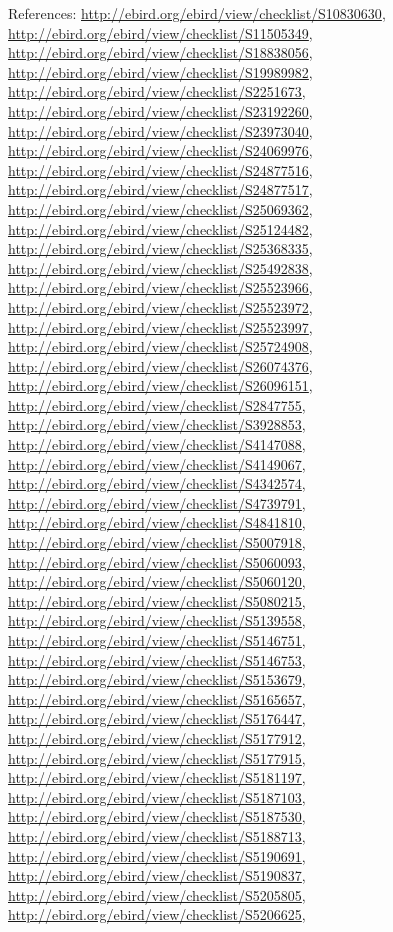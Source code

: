 \documentclass[9pt, article]{memoir}
\begin{document}
\begin{multicols}{2}
References: 
\url{http://ebird.org/ebird/view/checklist/S10830630}, 
\url{http://ebird.org/ebird/view/checklist/S11505349}, 
\url{http://ebird.org/ebird/view/checklist/S18838056}, 
\url{http://ebird.org/ebird/view/checklist/S19989982}, 
\url{http://ebird.org/ebird/view/checklist/S2251673}, 
\url{http://ebird.org/ebird/view/checklist/S23192260}, 
\url{http://ebird.org/ebird/view/checklist/S23973040}, 
\url{http://ebird.org/ebird/view/checklist/S24069976}, 
\url{http://ebird.org/ebird/view/checklist/S24877516}, 
\url{http://ebird.org/ebird/view/checklist/S24877517}, 
\url{http://ebird.org/ebird/view/checklist/S25069362}, 
\url{http://ebird.org/ebird/view/checklist/S25124482}, 
\url{http://ebird.org/ebird/view/checklist/S25368335}, 
\url{http://ebird.org/ebird/view/checklist/S25492838}, 
\url{http://ebird.org/ebird/view/checklist/S25523966}, 
\url{http://ebird.org/ebird/view/checklist/S25523972}, 
\url{http://ebird.org/ebird/view/checklist/S25523997}, 
\url{http://ebird.org/ebird/view/checklist/S25724908}, 
\url{http://ebird.org/ebird/view/checklist/S26074376}, 
\url{http://ebird.org/ebird/view/checklist/S26096151}, 
\url{http://ebird.org/ebird/view/checklist/S2847755}, 
\url{http://ebird.org/ebird/view/checklist/S3928853}, 
\url{http://ebird.org/ebird/view/checklist/S4147088}, 
\url{http://ebird.org/ebird/view/checklist/S4149067}, 
\url{http://ebird.org/ebird/view/checklist/S4342574}, 
\url{http://ebird.org/ebird/view/checklist/S4739791}, 
\url{http://ebird.org/ebird/view/checklist/S4841810}, 
\url{http://ebird.org/ebird/view/checklist/S5007918}, 
\url{http://ebird.org/ebird/view/checklist/S5060093}, 
\url{http://ebird.org/ebird/view/checklist/S5060120}, 
\url{http://ebird.org/ebird/view/checklist/S5080215}, 
\url{http://ebird.org/ebird/view/checklist/S5139558}, 
\url{http://ebird.org/ebird/view/checklist/S5146751}, 
\url{http://ebird.org/ebird/view/checklist/S5146753}, 
\url{http://ebird.org/ebird/view/checklist/S5153679}, 
\url{http://ebird.org/ebird/view/checklist/S5165657}, 
\url{http://ebird.org/ebird/view/checklist/S5176447}, 
\url{http://ebird.org/ebird/view/checklist/S5177912}, 
\url{http://ebird.org/ebird/view/checklist/S5177915}, 
\url{http://ebird.org/ebird/view/checklist/S5181197}, 
\url{http://ebird.org/ebird/view/checklist/S5187103}, 
\url{http://ebird.org/ebird/view/checklist/S5187530}, 
\url{http://ebird.org/ebird/view/checklist/S5188713}, 
\url{http://ebird.org/ebird/view/checklist/S5190691}, 
\url{http://ebird.org/ebird/view/checklist/S5190837}, 
\url{http://ebird.org/ebird/view/checklist/S5205805}, 
\url{http://ebird.org/ebird/view/checklist/S5206625}, 

\end{multicols}
\end{document}
